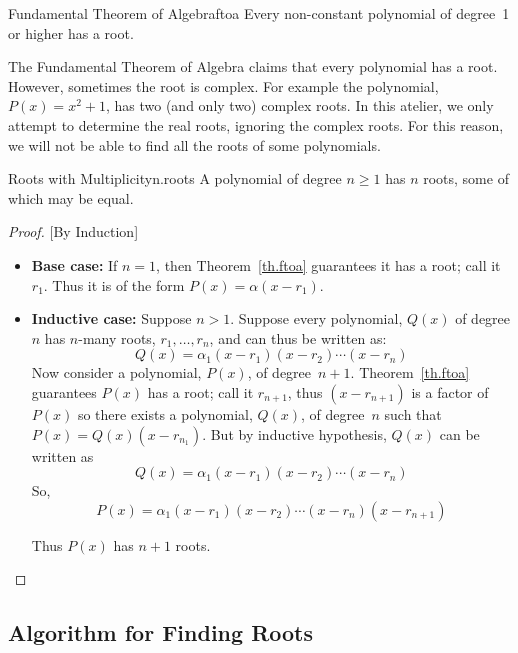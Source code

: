 \begin{theorem}{Fundamental Theorem of Algebra}{ftoa}
  Every non-constant polynomial of degree~1 or higher has a root.
\end{theorem}

The Fundamental Theorem of Algebra claims that every polynomial has a root.
However, sometimes the root is complex.  For example the polynomial,
$P(x) = x^2 + 1$, has two (and only two) complex roots.  In this atelier, we only
attempt to determine the real roots, ignoring the complex roots.  For
this reason, we will not be able to find all the roots of some
polynomials.

\begin{theorem}{Roots with Multiplicity}{n.roots}
  A polynomial of degree $n\ge 1$ has $n$ roots, some of which may be
  equal.
\end{theorem}
\begin{proof}

  [By Induction]
  
  \begin{itemize}
    
  \item \textbf{Base case:} If $n=1$, then Theorem~\ref{th.ftoa}
    guarantees it has a root; call it $r_1$.  Thus it is of the form
    $P(x)=\alpha (x-r_1)$.
  \item \textbf{Inductive case:} Suppose $n>1$.  Suppose every
    polynomial, $Q(x)$ of degree $n$ has $n$-many roots,
    $r_1,\ldots,r_n$, and can thus be written as:
    \[Q(x) = \alpha_1 (x - r_1) (x - r_2) \cdots (x - r_n)\]
    Now consider a polynomial, $P(x)$, of
    degree~$n+1$.  Theorem~\ref{th.ftoa} guarantees $P(x)$ has a root;
    call it $r_{n+1}$, thus $(x-r_{n+1})$ is a factor of $P(x)$ so there
    exists a polynomial, $Q(x)$, of degree~$n$ such that
    $P(x) =  Q(x) (x-r_{n_1})$.
    But by inductive hypothesis, $Q(x)$ can be written
    as \[Q(x) = \alpha_1 (x - r_1) (x - r_2) \cdots (x - r_n)\]
    So, \[P(x) = \alpha_1 (x - r_1) (x - r_2) \cdots (x - r_n) (x-r_{n+1})\]

    Thus $P(x)$ has $n+1$ roots.
  \end{itemize}
\end{proof}

\subsection{Algorithm for Finding Roots}

